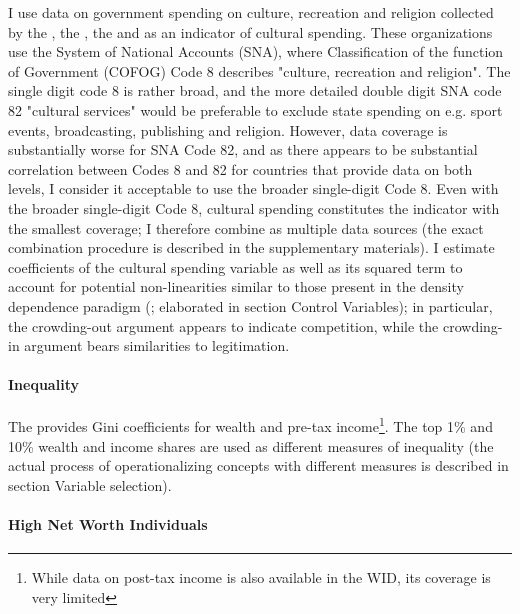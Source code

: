 \documentclass[11pt]{article}
\begin{document}
I use data on government spending on culture, recreation and religion collected by the \textcite{UN_2022_consumption}, the \textcite{IMF_2022_GFS}, the \textcite{OECD_2022_SNA_TABLE11_ARCHIVE,OECD_2022_SNA_TABLE11} and \textcite{Eurostat_2022_COFOG} as an indicator of cultural spending.
These organizations use the System of National Accounts (SNA), where Classification of the function of Government (COFOG) Code 8 describes "culture, recreation and religion".
The single digit code 8 is rather broad, and the more detailed  double digit SNA code 82 "cultural services" would be preferable to exclude state spending on e.g. sport events, broadcasting, publishing and religion. 
However, data coverage is substantially worse for SNA Code 82, and as there appears to be substantial correlation between Codes 8 and 82 for countries that provide data on both levels, I consider it acceptable to use the broader single-digit Code 8.
Even with the broader single-digit Code 8, cultural spending constitutes the indicator with the smallest coverage; I therefore combine as multiple data sources (the exact combination procedure is described in the supplementary materials).
I estimate coefficients of the cultural spending variable as well as its squared term to account for potential non-linearities similar to those present in the density dependence paradigm (\cite{Hannan_1992_dynamics};  elaborated in section Control Variables); in particular, the crowding-out argument appears to indicate competition, while the crowding-in argument bears similarities to legitimation.


\paragraph*{Inequality}

The \textcite{WID_2021_WID} provides Gini coefficients for wealth and pre-tax income\footnote{While data on post-tax income is also available in the WID, its coverage is very limited}.
The top 1\% and 10\% wealth and income shares are used as different measures of inequality (the actual process of operationalizing concepts with different measures is described in section Variable selection).


\paragraph*{High Net Worth Individuals}
\end{document}
